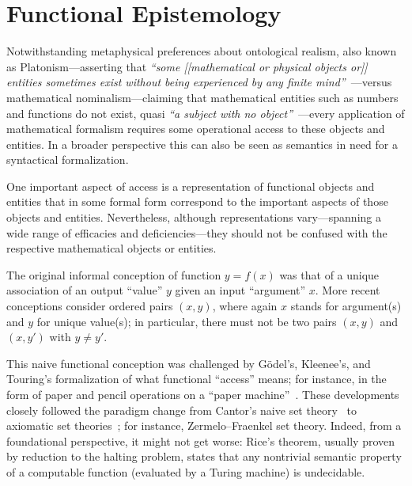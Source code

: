 \documentclass[axioms,article,accept,oneauthor,pdftex]{Definitions/mdpi}
\begin{document}
\section{Functional Epistemology}

Notwithstanding metaphysical preferences about ontological realism, also known as Platonism---asserting that
{\it ``some  [[mathematical or physical objects or]] entities sometimes exist
without being experienced by any finite mind''}~\cite{stace,Parsons1995}---versus mathematical
nominalism---claiming that mathematical entities such as numbers and functions do not exist,
quasi {\it ``a subject with no object''}~\cite{Burgess1999}---every
application of mathematical formalism requires some operational access to these objects and entities.
In a broader perspective this can also be seen as semantics in need for a syntactical formalization.

One important aspect of access is a representation of functional objects and entities
that in some formal form correspond to the important aspects of those objects and entities.
Nevertheless, although representations vary---spanning a wide range of efficacies and deficiencies---they
should not be confused with the respective mathematical objects or entities.

The original informal conception of function $y = f(x)$ was that of a unique association of an output ``value'' $y$ given an input ``argument'' $x$.
More recent conceptions consider ordered pairs $\left( x , y \right)$, where again $x$ stands for argument(s) and $y$ for unique value(s);
in particular, there must not be two pairs $\left( x , y \right)$ and $\left( x , y' \right)$ with $y \neq y'$.

This naive functional conception was challenged by G\"odel's, Kleenee's, and Touring's formalization
of what functional ``access'' means; for instance, in the form of paper and pencil operations
on a ``paper machine''~\cite{Turing-Intelligent_Machinery}.
These developments closely followed
the paradigm change from Cantor's naive set theory~\cite{Halmos1974-naiveset}
to axiomatic set theories~\cite{HrbacekJech1999};
for instance, Zermelo--Fraenkel set theory.
Indeed, from a foundational perspective, it might not get worse: Rice's theorem, usually proven by reduction to the halting problem,
states that any nontrivial semantic property of a computable function (evaluated by a Turing machine) is undecidable.
\end{document}

